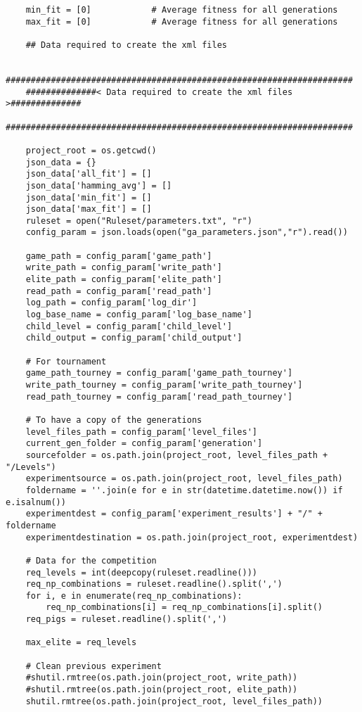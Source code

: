 \begin{verbatim}
    min_fit = [0]            # Average fitness for all generations
    max_fit = [0]            # Average fitness for all generations

    ## Data required to create the xml files

    #####################################################################
    ##############< Data required to create the xml files >##############
    #####################################################################

    project_root = os.getcwd()
    json_data = {}
    json_data['all_fit'] = []
    json_data['hamming_avg'] = []
    json_data['min_fit'] = []
    json_data['max_fit'] = []
    ruleset = open("Ruleset/parameters.txt", "r")
    config_param = json.loads(open("ga_parameters.json","r").read())

    game_path = config_param['game_path']
    write_path = config_param['write_path']
    elite_path = config_param['elite_path']
    read_path = config_param['read_path']
    log_path = config_param['log_dir']
    log_base_name = config_param['log_base_name']
    child_level = config_param['child_level']
    child_output = config_param['child_output']

    # For tournament
    game_path_tourney = config_param['game_path_tourney']
    write_path_tourney = config_param['write_path_tourney']
    read_path_tourney = config_param['read_path_tourney']

    # To have a copy of the generations
    level_files_path = config_param['level_files']
    current_gen_folder = config_param['generation']
    sourcefolder = os.path.join(project_root, level_files_path + "/Levels")
    experimentsource = os.path.join(project_root, level_files_path)
    foldername = ''.join(e for e in str(datetime.datetime.now()) if e.isalnum())
    experimentdest = config_param['experiment_results'] + "/" + foldername
    experimentdestination = os.path.join(project_root, experimentdest)

    # Data for the competition
    req_levels = int(deepcopy(ruleset.readline()))
    req_np_combinations = ruleset.readline().split(',')
    for i, e in enumerate(req_np_combinations):
        req_np_combinations[i] = req_np_combinations[i].split()
    req_pigs = ruleset.readline().split(',')

    max_elite = req_levels

    # Clean previous experiment
    #shutil.rmtree(os.path.join(project_root, write_path))
    #shutil.rmtree(os.path.join(project_root, elite_path))
    shutil.rmtree(os.path.join(project_root, level_files_path))


\end{verbatim}
